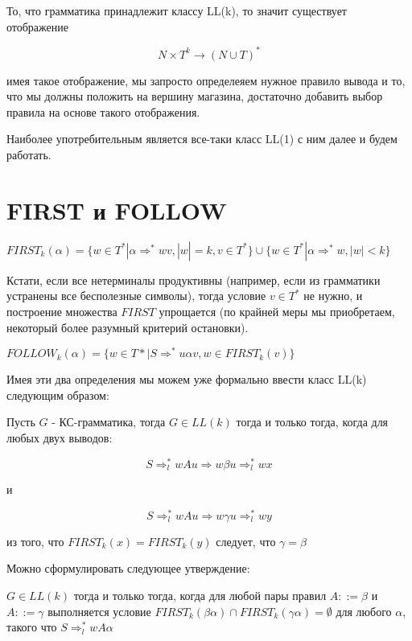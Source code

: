 То, что грамматика принадлежит классу LL(k), то значит существует отображение

$$ N \times T^k \rightarrow (N \cup T)^* $$

имея такое отображение, мы запросто определеяем нужное правило вывода и то, что мы должны положить на вершину 
магазина, достаточно добавить выбор правила на основе такого отображения.

Наиболее употребительным является все-таки класс LL(1) с ним далее и будем работать.

\section{FIRST и FOLLOW}

\begin{Def}
$FIRST_k\left( \alpha \right) = \lbrace w \in T^* | \alpha \Rightarrow^* w v, |w| = k, v \in T^* \rbrace \cup \lbrace w \in T^* | \alpha \Rightarrow^* w, |w| < k \rbrace$
\end{Def}

Кстати, если все нетерминалы продуктивны (например, если из грамматики устранены все бесполезные символы), тогда
условие $v \in T^*$ не нужно, и построение множества $FIRST$ упрощается (по крайней меры мы приобретаем,
некоторый более разумный критерий остановки).

\begin{Def}
$FOLLOW_k\left(\alpha\right) = \lbrace w \in T* | S \Rightarrow^* u \alpha v, w \in FIRST_k(v) \rbrace$
\end{Def}

Имея эти два определения мы можем уже формально ввести класс LL(k) следующим образом:

\begin{Def}
Пусть $G$ - КС-грамматика, тогда $G \in LL(k)$ тогда и только тогда, когда для любых двух выводов:

$$ S \Rightarrow^*_l w A u \Rightarrow w \beta u \Rightarrow^*_l w x $$

и

$$ S \Rightarrow^*_l w A u \Rightarrow w \gamma u \Rightarrow^*_l w y $$

из того, что $FIRST_k(x) = FIRST_k(y)$ следует, что $\gamma = \beta$
\end{Def}

Можно сформулировать следующее утверждение:

$G \in LL(k)$ тогда и только тогда, когда для любой пары правил $A ::= \beta$ и $A ::= \gamma$ выполняется
условие $FIRST_k(\beta \alpha) \cap FIRST_k(\gamma \alpha) = \emptyset$ для любого $\alpha$, такого что $S \Rightarrow ^*_l w A \alpha$

